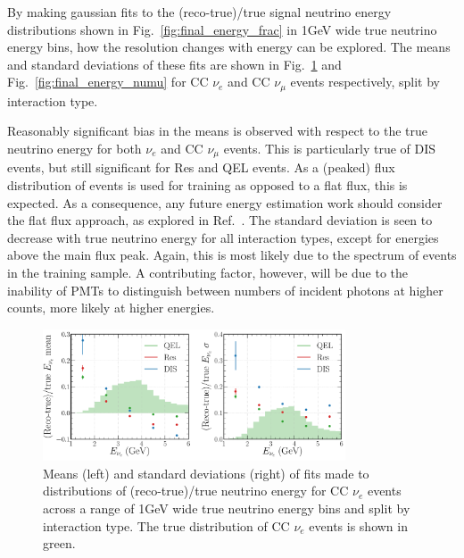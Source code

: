 By making gaussian fits to the (reco-true)/true signal neutrino energy distributions shown in
Fig.~\ref{fig:final_energy_frac} in \unit{1}{GeV} wide true neutrino energy bins, how the
resolution changes with energy can be explored. The means and standard deviations of these fits
are shown in Fig.~\ref{fig:final_energy_nuel} and Fig.~\ref{fig:final_energy_numu} for CC
$\nu_{e}$ and CC $\nu_{\mu}$ events respectively, split by interaction type.

Reasonably significant bias in the means is observed with respect to the true neutrino energy for
both $\nu_{e}$ and CC $\nu_{\mu}$ events. This is particularly true of DIS events, but still
significant for Res and QEL events. As a (peaked) flux distribution of events is used for training
as opposed to a flat flux, this is expected. As a consequence, any future energy estimation work
should consider the flat flux approach, as explored in Ref.~\cite{baldi2019}. The standard
deviation is seen to decrease with true neutrino energy for all interaction types, except for
energies above the main flux peak. Again, this is most likely due to the spectrum of events in the
training sample. A contributing factor, however, will be due to the inability of PMTs to
distinguish between numbers of incident photons at higher counts, more likely at higher energies.

\begin{figure} %
    \includegraphics[width=0.8\textwidth]{diagrams/7-results/final_energy_nuel.pdf}
    \caption[Means and standard deviations of fits to $\nu_{e}$ energy distributions]
    {Means (left) and standard deviations (right) of fits made to distributions of
        (reco-true)/true neutrino energy for CC $\nu_{e}$ events across a range of \unit{1}{GeV}
        wide true neutrino energy bins and split by interaction type. The true distribution of CC
        $\nu_{e}$ events is shown in green.}
    \label{fig:final_energy_nuel}
\end{figure}

